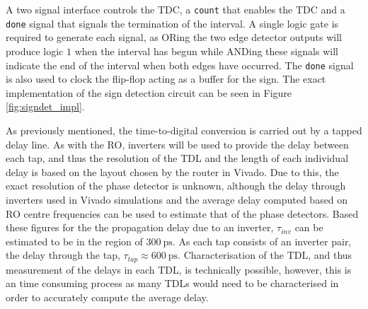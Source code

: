 A two signal interface controls the \ac{TDC}, a \texttt{count} that enables the \ac{TDC} and a \texttt{done} signal that signals the termination of the interval. A single logic gate is required to generate each signal, as ORing the two edge detector outputs will produce logic $1$ when the interval has begun while ANDing these signals will indicate the end of the interval when both edges have occurred. The \texttt{done} signal is also used to clock the flip-flop acting as a buffer for the sign. The exact implementation of the sign detection circuit can be seen in Figure \ref{fig:signdet_impl}.

As previously mentioned, the time-to-digital conversion is carried out by a tapped delay line. As with the \ac{RO}, inverters will be used to provide the delay between each tap, and thus the resolution of the \ac{TDL} and the length of each individual delay is based on the layout chosen by the router in Vivado. Due to this, the exact resolution of the phase detector is unknown, although the delay through inverters used in Vivado simulations and the average delay computed based on \ac{RO} centre frequencies can be used to estimate that of the phase detectors. Based these figures for the the propagation delay due to an inverter, $\tau_{inv}$ can be estimated to be in the region of $300~\si{\pico\second}$. As each tap consists of an inverter pair, the delay through the tap, $\tau_{tap} \approx 600~\si{\pico\second}$. Characterisation of the \ac{TDL}, and thus measurement of the delays in each \ac{TDL}, is technically possible, however, this is an time consuming process as many \acp{TDL} would need to be characterised in order to accurately compute the average delay. 

